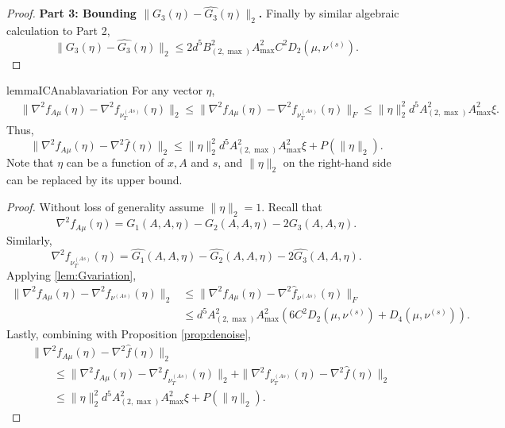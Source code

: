 \begin{proof}
	{\bf Part 3: Bounding $\|G_3(\eta) - \widehat{G_3}(\eta)\|_2$. }
	Finally by similar algebraic calculation to Part 2,
	\[
	\|G_3(\eta) - \widehat{G_3}(\eta)\|_2 \le 2 d^5  B_{(2,\max)}^2A_{\max}^2C^2D_2(\mu, \nu^{(s)}).
	\]
\end{proof}


\begin{restatable}{lemma}{ICAnablavariation}
	\label{lem:nablavariation}
	For any vector $\eta$,
	\begin{align*}
	& \|\nabla^2 f_{A\mu}(\eta) - \nabla^2 f_{\nu_T^{(As)}}(\eta)  \|_2  \le \|\nabla^2 f_{A\mu}(\eta) - \nabla^2 f_{\nu_T^{(As)}}(\eta)  \|_F \le  \|\eta\|_2^2  d^5 A_{(2,\max)}^2A_{\max}^2\xi.
	\end{align*}
	Thus, 
	\[
	\|\nabla^2 f_{A\mu}(\eta) - \nabla^2\widehat{f}(\eta)\|_2 \le  \|\eta\|_2^2  d^5 A_{(2,\max)}^2A_{\max}^2\xi + P(\|\eta\|_2).
	\]
	Note that $\eta$ can be a function of $x, A$ and $s$, and $\|\eta\|_2$ on the right-hand side can be replaced by its upper bound.
\end{restatable}
\begin{proof}
	Without loss of generality assume $\|\eta\|_2 = 1$. Recall that  
	\[
	\nabla^2 f_{A\mu}(\eta) = G_1(A,A,\eta) - G_2(A,A,\eta) -2G_3(A,A,\eta).
	\]
	Similarly,
	\[
	\nabla^2 f_{\nu_T^{(As)}}(\eta) =\widehat{G_1}(A,A,\eta) - \widehat{G_2}(A,A,\eta) -2\widehat{G_3}(A,A,\eta).
	\]
	Applying \cref{lem:Gvariation}, 
	\begin{align*}
	\|\nabla^2 f_{A\mu}(\eta) - \nabla^2 \hat{f}_{\nu^{(As)}}(\eta)  \|_2 & \le \|\nabla^2 f_{A\mu}(\eta) - \nabla^2 \hat{f}_{\nu^{(As)}}(\eta) \|_F \\
	& \le d^5  A_{(2,\max)}^2A_{\max}^2\left( 6C^2D_2(\mu, \nu^{(s)}) + D_4(\mu, \nu^{(s)})\right).
	\end{align*}
	Lastly, combining with Proposition \ref{prop:denoise}, 
	\begin{align*}
	&\|\nabla^2 f_{A\mu}(\eta) - \nabla^2\hat{f}(\eta)\|_2 \\
	&\qquad  \le \|\nabla^2 f_{A\mu}(\eta) - \nabla^2 f_{\nu_T^{(As)}}(\eta)\|_2 + \| \nabla^2 f_{\nu_T^{(As)}}(\eta) - \nabla^2\hat{f}(\eta)\|_2 \\
	& \qquad \le \|\eta\|_2^2  d^5 A_{(2,\max)}^2A_{\max}^2\xi + P(\|\eta\|_2).
	\end{align*}
\end{proof}

